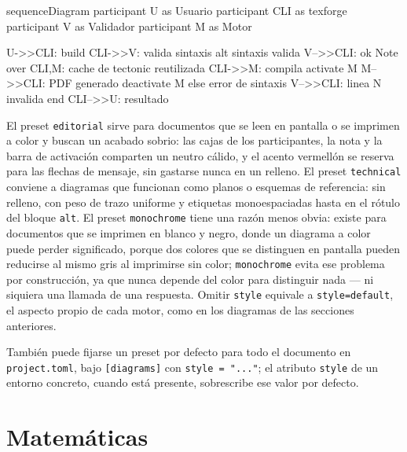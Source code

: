 \documentclass[a4paper,12pt]{article}
\begin{document}
  \begin{mermaid}[style=technical, width=0.85\linewidth, caption={Preset \texttt{technical}: cajas sin relleno, trazo uniforme y etiquetas monoespaciadas, incluida la etiqueta del bloque \texttt{alt}}, pos=H]
    sequenceDiagram
    participant U as Usuario
    participant CLI as texforge
    participant V as Validador
    participant M as Motor

    U->>CLI: build
    CLI->>V: valida sintaxis
    alt sintaxis valida
    V-->>CLI: ok
    Note over CLI,M: cache de tectonic reutilizada
    CLI->>M: compila
    activate M
    M-->>CLI: PDF generado
    deactivate M
    else error de sintaxis
    V-->>CLI: linea N invalida
    end
    CLI-->>U: resultado
  \end{mermaid}

  El preset \texttt{editorial} sirve para documentos que se leen en pantalla
  o se imprimen a color y buscan un acabado sobrio: las cajas de los
  participantes, la nota y la barra de activación comparten un neutro
  cálido, y el acento vermellón se reserva para las flechas de mensaje, sin
  gastarse nunca en un relleno. El preset \texttt{technical} conviene a
  diagramas que funcionan como planos o esquemas de referencia: sin
  relleno, con peso de trazo uniforme y etiquetas monoespaciadas hasta en
  el rótulo del bloque \texttt{alt}. El preset \texttt{monochrome} tiene una
  razón menos obvia: existe para documentos que se imprimen en blanco y
  negro, donde un diagrama a color puede perder significado, porque dos
  colores que se distinguen en pantalla pueden reducirse al mismo gris al
  imprimirse sin color; \texttt{monochrome} evita ese problema por
  construcción, ya que nunca depende del color para distinguir nada --- ni
  siquiera una llamada de una respuesta. Omitir \texttt{style} equivale a
  \texttt{style=default}, el aspecto propio de cada motor, como en los
  diagramas de las secciones anteriores.

  También puede fijarse un preset por defecto para todo el documento en
  \texttt{project.toml}, bajo \texttt{[diagrams]} con \texttt{style = "..."};
  el atributo \texttt{style} de un entorno concreto, cuando está presente,
  sobrescribe ese valor por defecto.

  

  \section{Matemáticas}\label{sec:matematicas}
\end{document}
